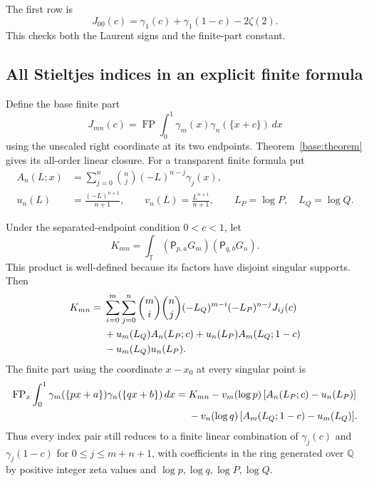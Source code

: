 The first row is
\[
 J_{00}(c)=\gamma_1(c)+\gamma_1(1-c)-2\zeta(2).
\]
This checks both the Laurent signs and the finite-part constant.

\subsection{All Stieltjes indices in an explicit finite formula}
Define the base finite part
\[
 J_{mn}(c)=\operatorname{FP}\int_0^1
               \gamma_m(x)\gamma_n(\{x+c\})\,dx
\]
using the unscaled right coordinate at its two endpoints. Theorem~\ref{base:theorem} gives its all-order linear closure. For a
transparent finite formula put
\begin{align*}
 A_n(L;x)&=\sum_{j=0}^n\binom nj(-L)^{n-j}\gamma_j(x),\\
 u_n(L)&=\frac{(-L)^{n+1}}{n+1},\qquad
 v_n(L)=\frac{L^{n+1}}{n+1},\qquad
 L_P=\log P,\quad L_Q=\log Q.
\end{align*}

\begin{theorem}
\label{dil:allindices}
Under the separated-endpoint condition $0<c<1$, let
\[
 K_{mn}=\int_{\mathbb T}(\mathsf P_{p,a}G_m)
                        (\mathsf P_{q,b}G_n).
\]
This product is well-defined because its factors have disjoint singular
supports. Then
\begin{align}
 K_{mn}={}&\sum_{i=0}^m\sum_{j=0}^n
   \binom mi\binom nj(-L_Q)^{m-i}(-L_P)^{n-j}J_{ij}(c)\notag\\
 &+u_m(L_Q)A_n(L_P;c)+u_n(L_P)A_m(L_Q;1-c)\notag\\
 &-u_m(L_Q)u_n(L_P).\label{dil:pullformula}
\end{align}
The finite part using the coordinate $x-x_0$ at every singular point is
\begin{align}
 \operatorname{FP}_x\int_0^1
     \gamma_m(\{px+a\})\gamma_n(\{qx+b\})\,dx
 ={}&K_{mn}-v_m(\log p)\,[A_n(L_P;c)-u_n(L_P)]\notag\\
 &-v_n(\log q)\,[A_m(L_Q;1-c)-u_m(L_Q)].
 \label{dil:intrinsicformula}
\end{align}
Thus every index pair still reduces to a finite linear combination of
$\gamma_j(c)$ and $\gamma_j(1-c)$ for $0\leq j\leq m+n+1$, with
coefficients in the ring generated over $\mathbb Q$ by positive integer
zeta values and $\log p,\log q,\log P,\log Q$.
\end{theorem}

